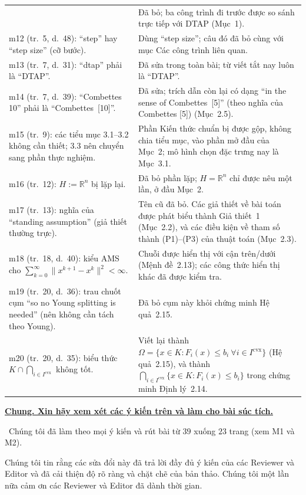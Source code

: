 \documentclass[11pt]{article}
\newcommand{\response}[1]{\smallskip\noindent{\color{blue!60!black}\textbf{Trả lời.}}\ #1\par\medskip}
\newenvironment{point}[1]{\medskip\noindent\textbf{\uline{#1}}\par}{\par}
\begin{document}
{\begin{longtable}{@{}>{\raggedright\arraybackslash}p{}
                    >{\raggedright\arraybackslash}p{}@{}}
  & Đã bỏ; ba công trình đi trước được so sánh trực tiếp với DTAP (Mục~1).\\
m12 (tr.~5, d.~48): ``step'' hay ``step size'' (cỡ bước).
  & Dùng ``step size''; câu đó đã bỏ cùng với mục Các công trình liên quan.\\
m13 (tr.~7, d.~31): ``dtap'' phải là ``DTAP''.
  & Đã sửa trong toàn bài; từ viết tắt nay luôn là ``DTAP''.\\
m14 (tr.~7, d.~39): ``Combettes 10'' phải là ``Combettes~[10]''.
  & Đã sửa; trích dẫn còn lại có dạng ``in the sense of Combettes~[5]'' (theo nghĩa của Combettes [5]) (Mục~2.5).\\
m15 (tr.~9): các tiểu mục 3.1--3.2 không cần thiết; 3.3 nên chuyển sang phần thực nghiệm.
  & Phần Kiến thức chuẩn bị được gộp, không chia tiểu mục, vào phần mở đầu của Mục~2; mô hình chọn đặc trưng nay là Mục~3.1.\\
m16 (tr.~12): $H:=\mathbb{R}^n$ bị lặp lại.
  & Đã bỏ phần lặp; $H=\mathbb{R}^n$ chỉ được nêu một lần, ở đầu Mục~2.\\
m17 (tr.~13): nghĩa của ``standing assumption'' (giả thiết thường trực).
  & Tên cũ đã bỏ. Các giả thiết về bài toán được phát biểu thành Giả thiết~1 (Mục~2.2), và các điều kiện về tham số thành (P1)--(P3) của thuật toán (Mục~2.3).\\
m18 (tr.~18, d.~40): kiểu AMS cho $\sum_{k=0}^{\infty}\lVert x^{k+1}-x^k\rVert^2<\infty$.
  & Chuỗi được hiển thị với cận trên/dưới (Mệnh đề~2.13); các công thức hiển thị khác đã được kiểm tra.\\
m19 (tr.~20, d.~36): trau chuốt cụm ``so no Young splitting is needed'' (nên không cần tách theo Young).
  & Đã bỏ cụm này khỏi chứng minh Hệ quả~2.15.\\
m20 (tr.~20, d.~35): biểu thức $K\cap\bigcap_{i\in I^{\mathrm{cvx}}}$ không tốt.
  & Viết lại thành $\Omega=\{x\in K:F_i(x)\le b_i\ \forall i\in I^{\mathrm{cvx}}\}$ (Hệ quả~2.15), và thành $\bigcap_{i\in I^{\mathrm{cvx}}}\{x\in K:F_i(x)\le b_i\}$ trong chứng minh Định lý~2.14.\\
\end{longtable}}

\begin{point}{Chung. Xin hãy xem xét các ý kiến trên và làm cho bài súc tích.}
\response{Chúng tôi đã làm theo mọi ý kiến và rút bài từ $39$ xuống $23$ trang
(xem M1 và M2).}
\end{point}

\bigskip
\noindent Chúng tôi tin rằng các sửa đổi này đã trả lời đầy đủ ý kiến của các Reviewer và Editor
và đã cải thiện độ rõ ràng và chặt chẽ của bản thảo. Chúng tôi một lần nữa cảm ơn
các Reviewer và Editor đã dành thời gian.
\end{document}
